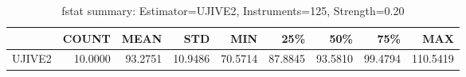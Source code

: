 \begin{table}[ht]
\centering
\caption{fstat summary: Estimator=UJIVE2, Instruments=125, Strength=0.20}
\begin{tabular}{lrrrrrrrr}
\toprule
 & COUNT & MEAN & STD & MIN & 25\% & 50\% & 75\% & MAX \\
\midrule
UJIVE2 & 10.0000 & 93.2751 & 10.9486 & 70.5714 & 87.8845 & 93.5810 & 99.4794 & 110.5419 \\
\bottomrule
\end{tabular}
\end{table}
